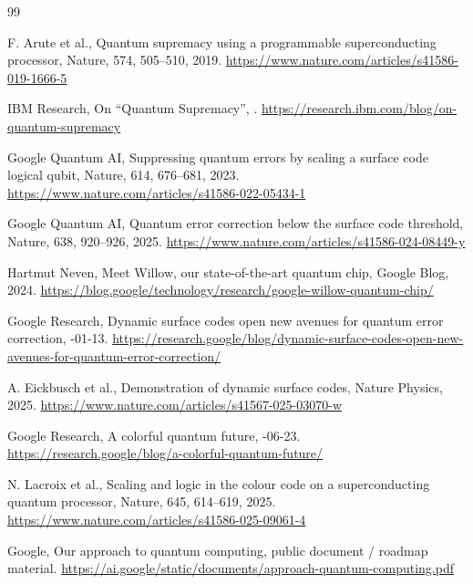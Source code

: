 \documentclass[11pt,a4paper]{article}
\begin{document}
\begingroup
\sloppy
\raggedright
\begin{thebibliography}{99}
\small

F. Arute et al.,
\newblock Quantum supremacy using a programmable superconducting processor,
\newblock Nature, 574, 505--510, 2019.
\newblock \url{https://www.nature.com/articles/s41586-019-1666-5}

IBM Research,
\newblock On ``Quantum Supremacy'',
.
\newblock \url{https://research.ibm.com/blog/on-quantum-supremacy}

Google Quantum AI,
\newblock Suppressing quantum errors by scaling a surface code logical qubit,
\newblock Nature, 614, 676--681, 2023.
\newblock \url{https://www.nature.com/articles/s41586-022-05434-1}

Google Quantum AI,
\newblock Quantum error correction below the surface code threshold,
\newblock Nature, 638, 920--926, 2025.
\newblock \url{https://www.nature.com/articles/s41586-024-08449-y}

Hartmut Neven,
\newblock Meet Willow, our state-of-the-art quantum chip,
\newblock Google Blog, 2024.
\newblock \url{https://blog.google/technology/research/google-willow-quantum-chip/}

Google Research,
\newblock Dynamic surface codes open new avenues for quantum error correction,
-01-13.
\newblock \url{https://research.google/blog/dynamic-surface-codes-open-new-avenues-for-quantum-error-correction/}

A. Eickbusch et al.,
\newblock Demonstration of dynamic surface codes,
\newblock Nature Physics, 2025.
\newblock \url{https://www.nature.com/articles/s41567-025-03070-w}

Google Research,
\newblock A colorful quantum future,
-06-23.
\newblock \url{https://research.google/blog/a-colorful-quantum-future/}

N. Lacroix et al.,
\newblock Scaling and logic in the colour code on a superconducting quantum processor,
\newblock Nature, 645, 614--619, 2025.
\newblock \url{https://www.nature.com/articles/s41586-025-09061-4}

Google,
\newblock Our approach to quantum computing,
\newblock public document / roadmap material.
\newblock \url{https://ai.google/static/documents/approach-quantum-computing.pdf}


\end{thebibliography}
\end{document}
